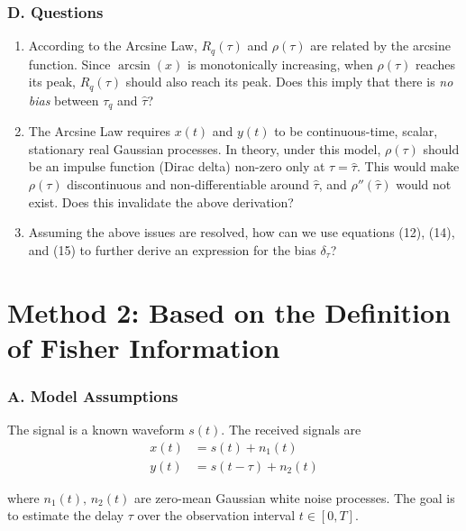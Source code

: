 \documentclass{article}
\begin{document}
	\subsubsection*{D. Questions}
	\begin{enumerate}
		\item According to the Arcsine Law, $R_q(\tau)$ and $\rho(\tau)$ are related by the arcsine function. Since $\arcsin(x)$ is monotonically increasing, when $\rho(\tau)$ reaches its peak, $R_q(\tau)$ should also reach its peak. Does this imply that there is \textit{no bias} between $\tau_q$ and $\hat{\tau}$?
		
		\item The Arcsine Law requires $x(t)$ and $y(t)$ to be continuous-time, scalar, stationary real Gaussian processes. In theory, under this model, $\rho(\tau)$ should be an impulse function (Dirac delta) non-zero only at $\tau = \hat{\tau}$. This would make $\rho(\tau)$ discontinuous and non-differentiable around $\hat{\tau}$, and $\rho''(\hat{\tau})$ would not exist. Does this invalidate the above derivation?
		
		\item Assuming the above issues are resolved, how can we use equations (12), (14), and (15) to further derive an expression for the bias $\delta_\tau$?
	\end{enumerate}
	
	\section*{Method 2: Based on the Definition of Fisher Information}
	
	\subsubsection*{A. Model Assumptions}
	The signal is a known waveform $s(t)$. The received signals are
	\begin{equation}
		\begin{aligned}
			x(t) &= s(t) + n_1(t) \\
			y(t) &= s(t - \tau) + n_2(t) 
		\end{aligned}
	\end{equation}
	
	where $n_1(t), \, n_2(t)$ are zero-mean Gaussian white noise processes. The goal is to estimate the delay $\tau$ over the observation interval $t \in [0, T]$.
	
\end{document}
